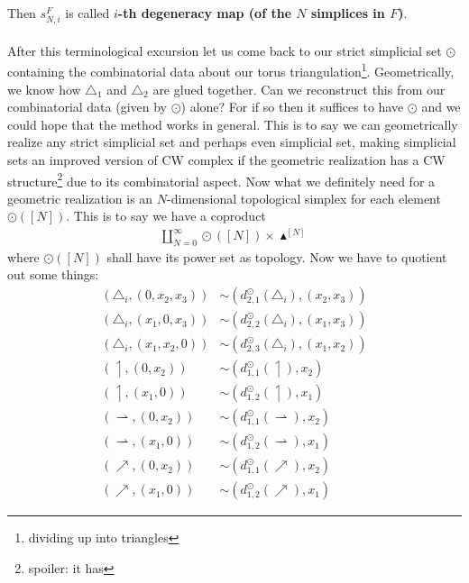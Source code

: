 Then $s_{N,i}^{F}$ is called \textbf{$i$-th degeneracy map (of the $N$ simplices in $F$)}.
\\\\
After this terminological excursion let us come back to our strict simplicial set $\odot$ containing the combinatorial data about our torus triangulation\footnote{dividing up into triangles}. Geometrically, we know how $\triangle_{1}$ and $\triangle_{2}$ are glued together. Can we reconstruct this from our combinatorial data (given by $\odot$) alone? For if so then it suffices to have $\odot$ and we could hope that the method works in general. This is to say we can geometrically realize any strict simplicial set and perhaps even simplicial set, making simplicial sets an improved version of CW complex if the geometric realization has a CW structure\footnote{spoiler: it has} due to its combinatorial aspect. Now what we definitely need for a geometric realization is an $N$-dimensional topological simplex for each element $\odot([N])$. This is to say we have a coproduct
\begin{align*}
  \coprod_{N=0}^{\infty}
  \odot([N])
  \times
  \blacktriangle^{[N]}
\end{align*}
where $\odot([N])$ shall have its power set as topology. Now we have to quotient out some things:
\begin{align*}
  \left(
    \triangle_{i},
    (0,x_{2},x_{3})
  \right)
  &\sim
  \left(
    d_{2,1}^{\odot}(\triangle_{i}),
    (x_{2},x_{3})
  \right)
  \\
  \left(
    \triangle_{i},
    (x_{1},0,x_{3})
  \right)
  &\sim
  \left(
    d_{2,2}^{\odot}(\triangle_{i}),
    (x_{1},x_{3})
  \right)
  \\
  \left(
    \triangle_{i},
    (x_{1},x_{2},0)
  \right)
  &\sim
  \left(
    d_{2,3}^{\odot}(\triangle_{i}),
    (x_{1},x_{2})
  \right)
  \\
  \left(
    \upharpoonleft,
    (0,x_{2})
  \right)
  &\sim
  \left(
    d_{1,1}^{\odot}(\upharpoonleft),
    x_{2}
  \right)
  \\
  \left(
    \upharpoonleft,
    (x_{1},0)
  \right)
  &\sim
  \left(
    d_{1,2}^{\odot}(\upharpoonleft),
    x_{1}
  \right)
  \\
  \left(
    \rightharpoonup,
    (0,x_{2})
  \right)
  &\sim
  \left(
    d_{1,1}^{\odot}(\rightharpoonup),
    x_{2}
  \right)
  \\
  \left(
    \rightharpoonup,
    (x_{1},0)
  \right)
  &\sim
  \left(
    d_{1,2}^{\odot}(\rightharpoonup),
    x_{1}
  \right)
  \\
  \left(
    \nearrow,
    (0,x_{2})
  \right)
  &\sim
  \left(
    d_{1,1}^{\odot}(\nearrow),
    x_{2}
  \right)
  \\
  \left(
    \nearrow,
    (x_{1},0)
  \right)
  &\sim
  \left(
    d_{1,2}^{\odot}(\nearrow),
    x_{1}
  \right)
\end{align*}
